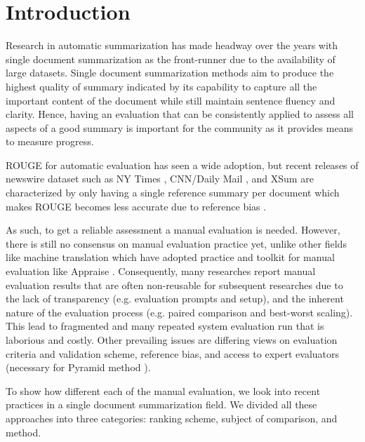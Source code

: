 \documentclass[11pt,a4paper]{article}
\begin{document}
\section{Introduction}

Research in automatic summarization has made headway over the years with single document summarization as the front-runner due to the availability of large datasets. Single document summarization methods \citep{See2017, Kryscinski2018, Shashi2018} aim to produce the highest quality of summary indicated by its capability to capture all the important content of the document while still maintain sentence fluency and clarity. Hence, having %
an evaluation that can be consistently applied to assess all aspects of a good summary is important for the community as it provides means to measure progress. %

ROUGE \citep{Lin2004} for automatic evaluation has seen a wide adoption, but recent releases of newswire dataset such as NY Times \citep{Sandhaus2008}, CNN/Daily Mail \citep{Hermann2015}, and XSum \citep{Shashi2018} are characterized by only having a single reference summary per document which makes ROUGE becomes less accurate due to reference bias \citep{Louis2013}. 

As such, to get a reliable assessment a manual evaluation is needed. However, there is still no consensus on manual evaluation practice yet, unlike other fields like machine translation which have adopted practice and toolkit for manual evaluation like Appraise \citep{Federmann2012}. %
Consequently, many researches report manual evaluation results that are often non-reusable for subsequent researches due to the lack of transparency (e.g. evaluation prompts and setup), and the inherent nature of the evaluation process (e.g. paired comparison and best-worst scaling). This lead to fragmented and many repeated system evaluation run that is laborious and costly. Other prevailing issues are differing views on evaluation criteria and validation scheme, reference bias, and access to expert evaluators (necessary for Pyramid method \citep{Nenkova2004}). 

To show how different each of the manual evaluation, we look into recent practices in a single document summarization field. We divided all these approaches into three categories: ranking scheme, subject of comparison, and method. 
\end{document}
